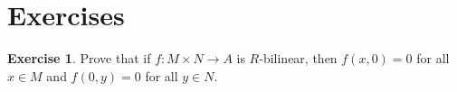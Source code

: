 \documentclass[11pt]{amsbook}
\DeclareMathOperator\Hom{Hom}
\theoremstyle{plain}
\newtheorem{corollary}[theorem]{Corollary}
\theoremstyle{definition}
\newtheorem{exercise}{Exercise}
\begin{document}
%
%
%
%
%


\newpage
\section*{Exercises}


\begin{exercise}\label{exc:bilinear-zero}
Prove that if $f\colon M\times N \to A$ is $R$-bilinear, then $f(x,0)=0$ for all $x\in M$ and $f(0,y)=0$ for all $y\in N$.
\end{exercise}
\end{document}
